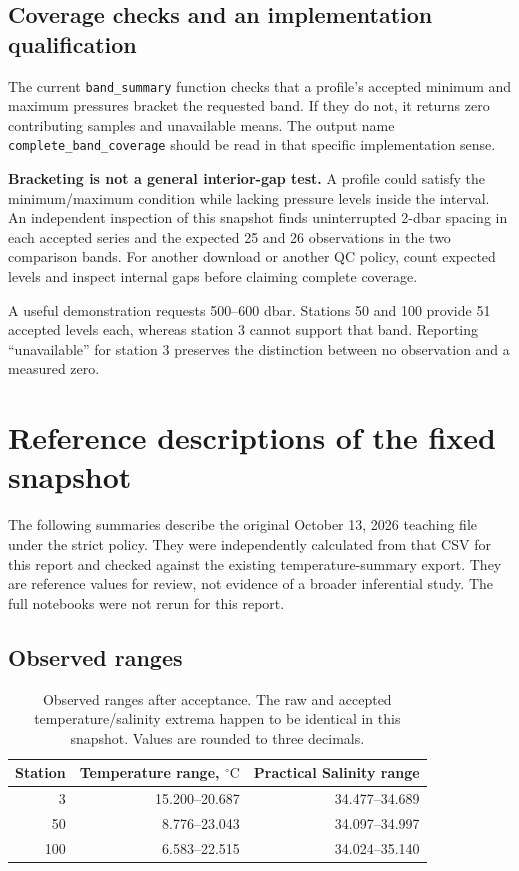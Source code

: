 \documentclass[11pt,letterpaper]{article}
\newcommand{\field}[1]{\nolinkurl{#1}}
\newcommand{\degC}{\ensuremath{{}^{\circ}\mathrm{C}}}
\begin{document}
\subsection{Coverage checks and an implementation qualification}
The current \field{band_summary} function checks that a profile's accepted minimum and maximum pressures bracket the requested band. If they do not, it returns zero contributing samples and unavailable means. The output name \field{complete_band_coverage} should be read in that specific implementation sense.

\textbf{Bracketing is not a general interior-gap test.} A profile could satisfy the minimum/maximum condition while lacking pressure levels inside the interval. An independent inspection of this snapshot finds uninterrupted 2-dbar spacing in each accepted series and the expected 25 and 26 observations in the two comparison bands. For another download or another QC policy, count expected levels and inspect internal gaps before claiming complete coverage.

A useful demonstration requests 500--600 dbar. Stations 50 and 100 provide 51 accepted levels each, whereas station 3 cannot support that band. Reporting ``unavailable'' for station 3 preserves the distinction between no observation and a measured zero.

\section{Reference descriptions of the fixed snapshot}
\label{sec:reference}

The following summaries describe the original October 13, 2026 teaching file under the strict policy. They were independently calculated from that CSV for this report and checked against the existing temperature-summary export. They are reference values for review, not evidence of a broader inferential study. The full notebooks were not rerun for this report.

\subsection{Observed ranges}
\begin{table}[htbp]
\centering
\caption{Observed ranges after acceptance. The raw and accepted temperature/salinity extrema happen to be identical in this snapshot. Values are rounded to three decimals.}
\label{tab:ranges}
\begin{tabular}{rrr}
\toprule
\textbf{Station} & \textbf{Temperature range, \degC} & \textbf{Practical Salinity range} \\
\midrule
3 & 15.200--20.687 & 34.477--34.689 \\
50 & 8.776--23.043 & 34.097--34.997 \\
100 & 6.583--22.515 & 34.024--35.140 \\
\bottomrule
\end{tabular}
\end{table}
\end{document}
